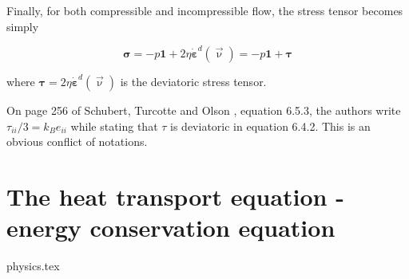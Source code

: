 Finally, for both compressible and incompressible flow, the stress tensor becomes simply
\begin{mdframed}[backgroundcolor=blue!5]
\begin{equation}
{\bm \sigma}=-p {\bm 1} + 2\eta \dot{\bm \varepsilon}^d(\vec\upnu) = -p {\bm 1} + {\bm \tau}
\end{equation}
\end{mdframed}
where ${\bm \tau} = 2\eta \dot{\bm \varepsilon}^d(\vec\upnu)$ is the deviatoric stress tensor.

\begin{remark}
On page 256 of Schubert, Turcotte and Olson \cite{scto01}, 
equation 6.5.3, the authors write $\tau_{ii}/3=k_B e_{ii}$ while stating that $\tau$ is deviatoric in equation 6.4.2. 
This is an obvious conflict of notations. 
\end{remark}

\section{The heat transport equation - energy conservation equation \label{ss:hte}}
\begin{flushright} {\tiny {\color{gray} physics.tex}} \end{flushright}

